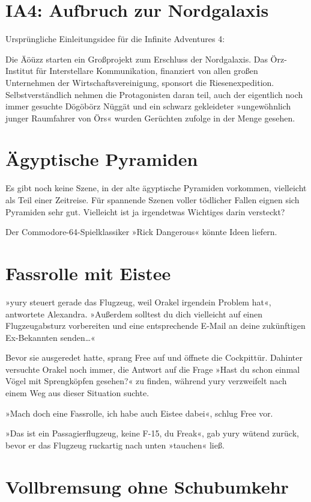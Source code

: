\section{IA4: Aufbruch zur Nordgalaxis}

Ursprüngliche Einleitungsidee für die Infinite Adventures 4:

Die Äöüzz starten ein Großprojekt zum Erschluss der Nordgalaxis. Das Örz-Institut für Interstellare Kommunikation, finanziert von allen großen Unternehmen der Wirtschaftsvereinigung, sponsort die Riesenexpedition. Selbstverständlich nehmen die Protagonisten daran teil, auch der eigentlich noch immer gesuchte Dögöbörz Nüggät und ein schwarz gekleideter »ungewöhnlich junger Raumfahrer von Örs« wurden Gerüchten zufolge in der Menge gesehen.


\section{Ägyptische Pyramiden}

Es gibt noch keine Szene, in der alte ägyptische Pyramiden vorkommen, vielleicht als Teil einer Zeitreise. Für spannende Szenen voller tödlicher Fallen eignen sich Pyramiden sehr gut. Vielleicht ist ja irgendetwas Wichtiges darin versteckt?

Der Commodore-64-Spielklassiker »Rick Dangerous« könnte Ideen liefern.


\section{Fassrolle mit Eistee}

»yury steuert gerade das Flugzeug, weil Orakel irgendein Problem hat«, antwortete Alexandra. »Außerdem solltest du dich vielleicht auf einen Flugzeugabsturz vorbereiten und eine entsprechende E-Mail an deine zukünftigen Ex-Bekannten senden…«

Bevor sie ausgeredet hatte, sprang Free auf und öffnete die Cockpittür. Dahinter versuchte Orakel noch immer, die Antwort auf die Frage »Hast du schon einmal Vögel mit Sprengköpfen gesehen?« zu finden, während yury verzweifelt nach einem Weg aus dieser Situation suchte.

»Mach doch eine Fassrolle, ich habe auch Eistee dabei«, schlug Free vor.

»Das ist ein Passagierflugzeug, keine F-15, du Freak«, gab yury wütend zurück, bevor er das Flugzeug ruckartig nach unten »tauchen« ließ.


\section{Vollbremsung ohne Schubumkehr}


